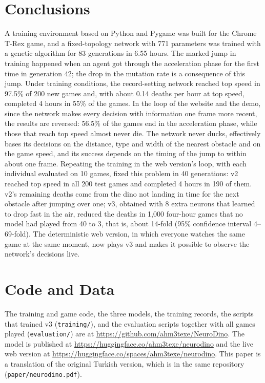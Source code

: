 \documentclass[11pt,a4paper]{article}
\begin{document}
\section{Conclusions}

A training environment based on Python and Pygame was built for the Chrome T-Rex game, and a fixed-topology network with 771 parameters was trained with a genetic algorithm for 83 generations in 6.55 hours. The marked jump in training happened when an agent got through the acceleration phase for the first time in generation 42; the drop in the mutation rate is a consequence of this jump. Under training conditions, the record-setting network reached top speed in 97.5\% of 200 new games and, with about 0.14 deaths per hour at top speed, completed 4 hours in 55\% of the games. In the loop of the website and the demo, since the network makes every decision with information one frame more recent, the results are reversed: 56.5\% of the games end in the acceleration phase, while those that reach top speed almost never die. The network never ducks, effectively bases its decisions on the distance, type and width of the nearest obstacle and on the game speed, and its success depends on the timing of the jump to within about one frame. Repeating the training in the web version's loop, with each individual evaluated on 10 games, fixed this problem in 40 generations: v2 reached top speed in all 200 test games and completed 4 hours in 190 of them. v2's remaining deaths come from the dino not landing in time for the next obstacle after jumping over one; v3, obtained with 8 extra neurons that learned to drop fast in the air, reduced the deaths in 1,000 four-hour games that no model had played from 40 to 3, that is, about 14-fold (95\% confidence interval 4--69-fold). The deterministic web version, in which everyone watches the same game at the same moment, now plays v3 and makes it possible to observe the network's decisions live.

\section*{Code and Data}

The training and game code, the three models, the training records, the scripts that trained v3 (\texttt{training/}), and the evaluation scripts together with all games played (\texttt{evaluation/}) are at \url{https://github.com/ahm3texe/NeuroDino}. The model is published at \url{https://huggingface.co/ahm3texe/neurodino} and the live web version at \url{https://huggingface.co/spaces/ahm3texe/neurodino}. This paper is a translation of the original Turkish version, which is in the same repository (\texttt{paper/neurodino.pdf}).
\end{document}
